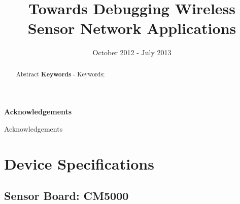 \documentclass[a4paper]{article}
\title{Towards Debugging Wireless Sensor Network Applications}
\date{October 2012 - July 2013}
\author{}
\makeatletter
\newcommand\ackname{Acknowledgements}
\newenvironment{acknowledgements}{%
      \titlepage
      \null\vfil
      \@beginparpenalty\@lowpenalty
      \begin{center}%
        \bfseries \ackname
        \@endparpenalty\@M
      \end{center}}%
     {\par\vfil\null\endtitlepage}
\newenvironment{acknowledgements}{%
      \if@twocolumn
        \section*{\abstractname}%
      \else
        \small
        \begin{center}%
          {\bfseries \ackname\vspace{-.5em}\vspace{\z@}}%
        \end{center}%
        \quotation
      \fi}
      {\if@twocolumn\else\endquotation\fi}
\makeatother
\begin{document}
\maketitle

\pagestyle{empty}
\thispagestyle{empty}

\newpage

\begin{abstract}
Abstract
\newline
\newline
\noindent \textbf{Keywords} - Keywords;
\end{abstract}
\newpage

\begin{acknowledgements}
Acknowledgements
\end{acknowledgements}
\newpage

\pagestyle{plain}
\setcounter{page}{1}

\tableofcontents
\clearpage

\clearpage

\appendixpage
\addappheadtotoc
\appendix

\section{Device Specifications}

\subsection{Sensor Board: CM5000}
\end{document}
